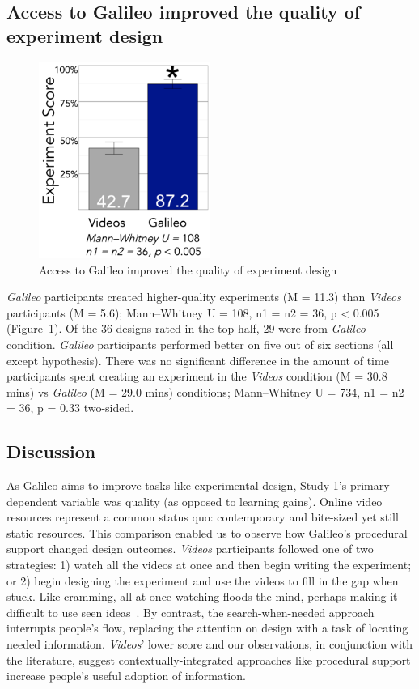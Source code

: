 \subsection{Access to Galileo improved the quality of experiment design}

\begin{figure}
  \includegraphics[width=0.5\textwidth]{figures/galileo/galileo-study1-7}
  \caption[Access to Galileo improved the quality of experiment design]
{Access to Galileo improved the quality of experiment design}
  \label{fig:galileo-result}
\end{figure}

\textit{Galileo} participants created higher-quality experiments (M = 11.3) than \textit{Videos} participants (M = 5.6); Mann–Whitney U = 108, n1 = n2 = 36, p < 0.005 (Figure~\ref{fig:galileo-result}). Of the 36 designs rated in the top half, 29 were from \textit{Galileo} condition. \textit{Galileo} participants performed better on five out of six sections (all except hypothesis). There was no significant difference in the amount of time participants spent creating an experiment in the \textit{Videos} condition (M = 30.8 mins) vs \textit{Galileo} (M = 29.0 mins) conditions; Mann–Whitney U = 734, n1 = n2 = 36, p = 0.33 two-sided. 

\subsection*{Discussion}
As Galileo aims to improve tasks like experimental design, Study 1's primary dependent variable was quality (as opposed to learning gains). Online video resources represent a common status quo: contemporary and bite-sized yet still static resources. This comparison enabled us to observe how Galileo's procedural support changed design outcomes. \textit{Videos} participants followed one of two strategies: 1) watch all the videos at once and then begin writing the experiment; or 2) begin designing the experiment and use the videos to fill in the gap when stuck. Like cramming, all-at-once watching floods the mind, perhaps making it difficult to use seen ideas~\cite{kornell2009optimising}. By contrast, the search-when-needed approach interrupts people's flow, replacing the attention on design with a task of locating needed information. \textit{Videos}' lower score and our observations, in conjunction with the literature, suggest contextually-integrated approaches like procedural support increase people's useful adoption of information.
   

